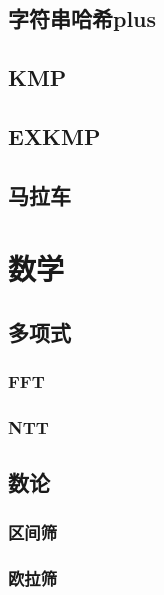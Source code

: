 \subsection{字符串哈希plus}

\subsection{KMP}


\subsection{EXKMP}


\subsection{马拉车}


\section{数学}
\subsection{多项式}
\subsubsection{FFT}


\subsubsection{NTT}

\subsection{数论}
\subsubsection{区间筛}


\subsubsection{欧拉筛}


